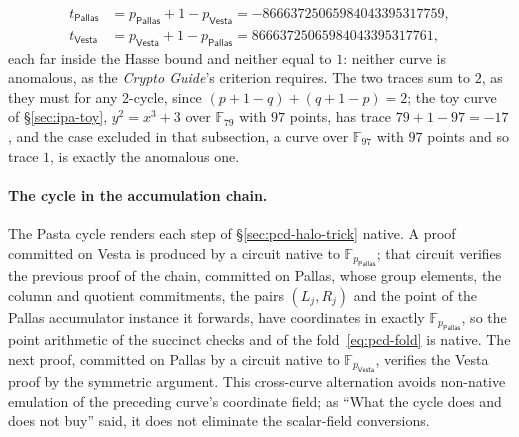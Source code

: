 \documentclass[11pt,a4paper]{article}
\theoremstyle{definition}
\newcommand{\F}{\mathbb{F}}
\newcommand{\Pallas}{\ensuremath{\mathsf{Pallas}}}
\newcommand{\Vesta}{\ensuremath{\mathsf{Vesta}}}
\begin{document}
\begin{align*}
t_{\Pallas} &= p_{\Pallas} + 1 - p_{\Vesta} = -86663725065984043395317759,\\
t_{\Vesta}  &= p_{\Vesta} + 1 - p_{\Pallas} = 86663725065984043395317761,
\end{align*}
each far inside the Hasse bound and neither equal to $1$: neither curve
is anomalous, as the \emph{Crypto Guide}'s criterion requires. The two
traces sum to $2$, as they must for any 2-cycle, since $(p + 1 - q) +
(q + 1 - p) = 2$; the toy curve of \S\ref{sec:ipa-toy}, $y^{2} = x^{3} +
3$ over $\F_{79}$ with $97$ points, has trace $79 + 1 - 97 = -17$, and
the case excluded in that subsection, a curve over $\F_{97}$ with $97$
points and so trace $1$, is exactly the anomalous one.

\paragraph{The cycle in the accumulation chain.}
The Pasta cycle renders each step of \S\ref{sec:pcd-halo-trick} native.
A proof committed on Vesta is produced by a circuit native to
$\F_{p_{\Pallas}}$; that circuit verifies the previous proof of the
chain, committed on Pallas, whose group elements, the column and
quotient commitments, the pairs $(L_j, R_j)$ and the point of the
Pallas accumulator instance it forwards, have coordinates in exactly
$\F_{p_{\Pallas}}$, so the point
arithmetic of the succinct checks and of the fold~\eqref{eq:pcd-fold} is
native. The next proof, committed on Pallas by a circuit native to
$\F_{p_{\Vesta}}$, verifies the Vesta proof by the symmetric argument.
This cross-curve alternation avoids non-native emulation of the
preceding curve's coordinate field; as ``What the cycle does and does
not buy'' said, it does not eliminate the scalar-field conversions.
\end{document}
